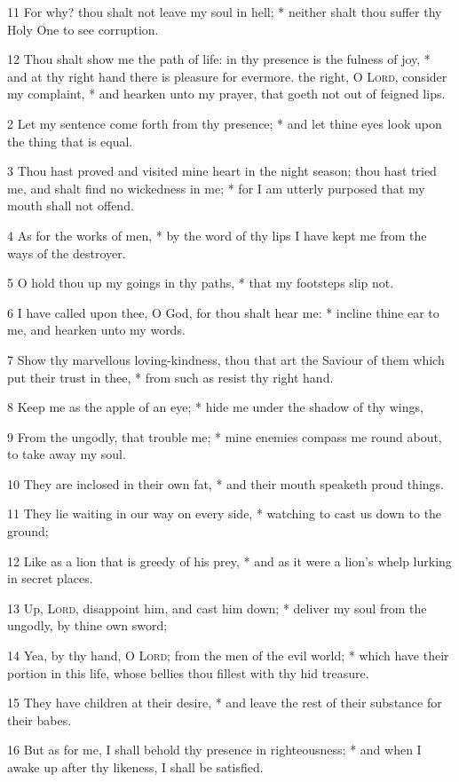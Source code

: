 11 For why? thou shalt not leave my soul in hell; * neither shalt thou suffer thy Holy One to see corruption.\par
12 Thou shalt show me the path of life: in thy presence is the fulness of joy, * and at thy right hand there is pleasure for evermore.
 the right, O {\textsc{Lord}}, consider my complaint, * and hearken unto my prayer, that goeth not out of feigned lips.\par
2 Let my sentence come forth from thy presence; * and let thine eyes look upon the thing that is equal.\par
3 Thou hast proved and visited mine heart in the night season; thou hast tried me, and shalt find no wickedness in me; * for I am utterly purposed that my mouth shall not offend.\par
4 As for the works of men, * by the word of thy lips I have kept me from the ways of the destroyer.\par
5 O hold thou up my goings in thy paths, * that my footsteps slip not.\par
6 I have called upon thee, O God, for thou shalt hear me: * incline thine ear to me, and hearken unto my words.\par
7 Show thy marvellous loving-kindness, thou that art the Saviour of them which put their trust in thee, * from such as resist thy right hand.\par
8 Keep me as the apple of an eye; * hide me under the shadow of thy wings,\par
9 From the ungodly, that trouble me; * mine enemies compass me round about, to take away my soul.\par
10 They are inclosed in their own fat, * and their mouth speaketh proud things.\par
11 They lie waiting in our way on every side, * watching to cast us down to the ground;\par
12 Like as a lion that is greedy of his prey, * and as it were a lion's whelp lurking in secret places.\par
13 Up, {\textsc{Lord}}, disappoint him, and cast him down; * deliver my soul from the ungodly, by thine own sword;\par
14 Yea, by thy hand, O {\textsc{Lord}}; from the men of the evil world; * which have their portion in this life, whose bellies thou fillest with thy hid treasure.\par
15 They have children at their desire, * and leave the rest of their substance for their babes.\par
16 But as for me, I shall behold thy presence in righteousness; * and when I awake up after thy likeness, I shall be satisfied.
